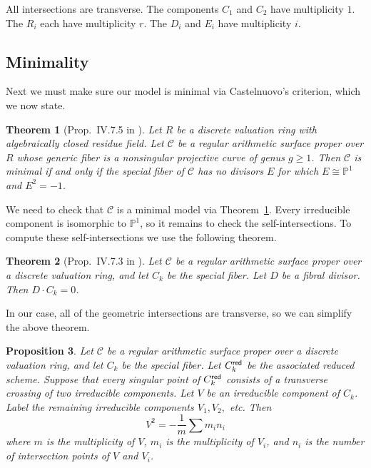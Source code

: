 \documentclass{article}
\newcommand{\scd}{\mathscr{C}}
\theoremstyle{plain}
\newtheorem{theorem}{Theorem}[section]
\newtheorem{proposition}[theorem]{Proposition}
\theoremstyle{definition}
\theoremstyle{remark}
\newcommand{\isom}{\cong}
\newcommand{\Pro}{\ensuremath{\mathbb{P}}}
\begin{document}
All intersections are transverse. The components $C_1$ and $C_2$ have multiplicity $1$. The $R_i$ each have multiplicity $r$. The $D_i$ and $E_i$ have multiplicity $i$.


\subsection{Minimality}
\label{sec:minimality}

Next we must make sure our model is minimal via Castelnuovo's criterion, which we now state.
\begin{theorem}[Prop.~IV.7.5 in \cite{silvermanATAEC}]\label{thm:castelnuovo}
  Let $R$ be a discrete valuation ring with algebraically closed residue field. Let $\scd$ be a regular arithmetic surface proper over $R$ whose generic fiber is a nonsingular projective curve of genus $g \geq 1$. Then $\scd$ is minimal if and only if the special fiber of $\scd$ has no divisors $E$ for which $E \isom \Pro^1$ and $E^2 = -1$.
\end{theorem}

We need to check that $\scd$ is a minimal model via Theorem~\ref{thm:castelnuovo}. Every irreducible component is isomorphic to $\Pro^1$, so it remains to check the self-intersections. To compute these self-intersections we use the following theorem.
\begin{theorem}[Prop.~IV.7.3 in \cite{silvermanATAEC}]\label{thm:fibral-intersect-total}
  Let $\scd$ be a regular arithmetic surface proper over a discrete valuation ring, and let $C_k$ be the special fiber. Let $D$ be a fibral divisor. Then $D \cdot C_k = 0$.
\end{theorem}

In our case, all of the geometric intersections are transverse, so we can simplify the above theorem.
\begin{proposition}
  Let $\scd$ be a regular arithmetic surface proper over a discrete valuation ring, and let $C_k$ be the special fiber. Let $C_k^{\sf red}$ be the associated reduced scheme. Suppose that every singular point of $C_k^{\sf red}$ consists of a transverse crossing of two irreducible components. Let $V$ be an irreducible component of $C_k$. Label the remaining irreducible components $V_1, V_2,$ etc. Then
  \[
  V^2 = -\frac{1}{m} \sum m_i n_i
  \]
  where $m$ is the multiplicity of $V$, $m_i$ is the multiplicity of $V_i$, and $n_i$ is the number of intersection points of $V$ and $V_i$.
\end{proposition}
\end{document}
